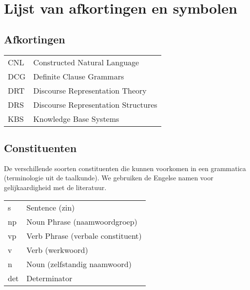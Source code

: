\chapter{Lijst van afkortingen en symbolen}
\section*{Afkortingen}
\begin{flushleft}
  \renewcommand{\arraystretch}{1.1}
  \begin{tabularx}{\textwidth}{@{}p{12mm}X@{}}
    CNL   & Constructed Natural Language \\
    DCG   & Definite Clause Grammars \\
    DRT   & Discourse Representation Theory \\
    DRS   & Discourse Representation Structures \\
    KBS   & Knowledge Base Systems \\
  \end{tabularx}
\end{flushleft}
\section*{Constituenten}
De verschillende soorten constituenten die kunnen voorkomen in een grammatica (terminologie uit de taalkunde). We gebruiken de Engelse namen voor gelijkaardigheid met de literatuur.
\begin{flushleft}
  \renewcommand{\arraystretch}{1.1}
  \begin{tabularx}{\textwidth}{@{}p{12mm}X@{}}
    s     & Sentence (zin) \\
    np    & Noun Phrase (naamwoordgroep) \\
    vp    & Verb Phrase (verbale constituent) \\
    v     & Verb (werkwoord) \\
    n     & Noun (zelfstandig naamwoord) \\
    det   & Determinator \\
  \end{tabularx}
\end{flushleft}

